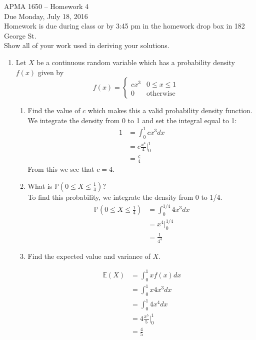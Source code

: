 \documentclass[12pt]{article}
\def\P{{\mathbb P}}
\def\E{{\mathbb E}}
\begin{document}
\title{}
\author{\vspace{-10ex} }

\begin{center}
{\LARGE APMA 1650 -- Homework 4}\\
\vspace{5mm}
{\large Due Monday, July 18, 2016}\\
\vspace{5mm}
Homework is due during class or by 3:45 pm in the homework drop box in 182 George St.\\
Show all of your work used in deriving your solutions.
\end{center}

\begin{enumerate}

\item Let $X$ be a continuous random variable which has a probability density $f(x)$ given by
\[
f(x) = \begin{cases}
c x^3 & 0 \leq x \leq 1 \\
0 & \text{otherwise}
\end{cases}
\]
\begin{enumerate}
\item Find the value of $c$ which makes this a valid probability density function.\\

We integrate the density from 0 to 1 and set the integral equal to 1:
\begin{align*}
1 &= \int_0^1 c x^3 dx \\
&= c \frac{x^4}{4}\Bigr|_0^1 \\
&= \frac{c}{4}
\end{align*}
From this we see that $c = 4$.

\item What is $\P(0 \leq X \leq \frac{1}{4})$?\\

To find this probability, we integrate the density from 0 to 1/4.
\begin{align*}
\P(0 \leq X \leq \frac{1}{4}) &= \int_0^{1/4} 4 x^3 dx \\
&= x^4 \Bigr|_0^{1/4} \\
&= \frac{1}{4^4}
\end{align*}

\item Find the expected value and variance of $X$.

\begin{align*}
\E(X) &= \int_0^1 x f(x) dx \\
&= \int_0^1 x 4x^3 dx \\
&= \int_0^1 4x^4 dx \\
&= 4 \frac{x^5}{5}\Bigr|_0^1 \\
&= \frac{4}{5}
\end{align*}


\end{enumerate}
\end{enumerate}
\end{document}
